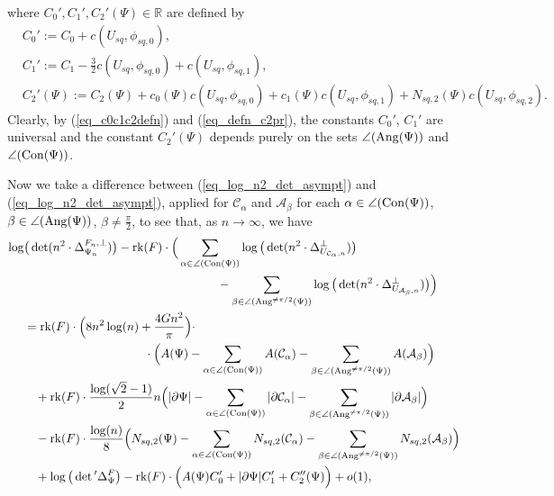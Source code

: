 \documentclass[12pt]{article}
\numberwithin{equation}{section}
\theoremstyle{theorem}
\theoremstyle{definition}
\theoremstyle{remark}
\newcommand{\real}{\mathbb{R}}
\newcommand{\laplcomp}{\Delta}
\newcommand{\rk}[1]{{\rm{rk}} ( #1 )}
\begin{document}
	where $C_0', C_1', C_2'(\Psi) \in \real$ are defined by
	\begin{equation}\label{eq_defn_c2pr}
	\begin{aligned}
		&
		C_0' := C_0 + c(U_{sq}, \phi_{sq, 0}),
		\\
		&
		C_1' := C_1 - \frac{3}{2} c(U_{sq}, \phi_{sq, 0}) +  c(U_{sq}, \phi_{sq, 1}),
		\\
		&
		C_2'(\Psi) := C_2(\Psi) + c_0(\Psi) c(U_{sq}, \phi_{sq, 0}) +  c_1(\Psi) c(U_{sq}, \phi_{sq, 1}) + N_{sq, 2}(\Psi) c(U_{sq}, \phi_{sq, 2}).
	\end{aligned}
	\end{equation}
	Clearly, by (\ref{eq_c0c1c2defn}) and (\ref{eq_defn_c2pr}), the constants $C_0'$, $C_1'$ are universal and the constant $C_2'(\Psi)$ depends purely on the sets $\angle({\rm{Ang}}(\Psi))$ and $\angle({\rm{Con}}(\Psi))$.
	\par 
	Now we take a difference between (\ref{eq_log_n2_det_asympt}) and (\ref{eq_log_n2_det_asympt}), applied for $\mathcal{C}_{\alpha}$ and $\mathcal{A}_{\beta}$ for each $\alpha \in \angle({\rm{Con}}(\Psi))$, $\beta \in \angle({\rm{Ang}}(\Psi))$, $\beta \neq \frac{\pi}{2}$, to see that, as $n \to \infty$, we have
	\begin{equation}\label{eq_log_n2_det_asympt2}
	\begin{aligned}
		\log & \big(\det(n^2 \cdot\laplcomp_{\Psi_n}^{F_n, \perp})\big)
		-
		\rk{F}
		\cdot
		\Big(
		\sum_{\alpha \in \angle({\rm{Con}}(\Psi))}
		\log \big(\det(n^2 \cdot  \laplcomp_{U_{\mathcal{C}_{\alpha}, n}}^{\perp})\big)
		\\
		&
		\qquad \qquad \qquad \qquad  \qquad \qquad \qquad \qquad 
		-
		\sum_{\beta \in \angle({\rm{Ang}}^{\neq \pi/2}(\Psi))}
		\log \big(\det(n^2 \cdot \laplcomp_{U_{\mathcal{A}_{\beta}, n}}^{\perp})\big)
		\Big)
		\\
		&
		=
		\rk{F}
		\cdot
		\Big( 8 n^2 \log(n) + \frac{4Gn^2}{\pi} \Big) \cdot 
		\\
		&
		\qquad \qquad \qquad \qquad \qquad 
		\cdot
		\Big( A(\Psi) -
			\sum_{\alpha \in \angle({\rm{Con}}(\Psi))}
			A(\mathcal{C}_{\alpha})
			-
			\sum_{\beta \in \angle({\rm{Ang}}^{\neq \pi/2}(\Psi))}
			A(\mathcal{A}_{\beta})
		\Big)
		\\
		&
		\phantom{= \,}
		+ 
		\rk{F}
		\cdot
		\frac{\log(\sqrt{2} - 1)}{2}
		n  
		\Big( | \partial \Psi | -
			\sum_{\alpha \in \angle({\rm{Con}}(\Psi))}
			|\partial  \mathcal{C}_{\alpha}|
			-
			\sum_{\beta \in \angle({\rm{Ang}}^{\neq \pi/2}(\Psi))}
			|\partial  \mathcal{A}_{\beta}|
		\Big)
		\\
		&
		\phantom{= \,}
		-
		\rk{F}
		\cdot
		\frac{\log(n)}{8} 
		\Big( N_{sq, 2}(\Psi) -
			\sum_{\alpha \in \angle({\rm{Con}}(\Psi))}
			N_{sq, 2}(\mathcal{C}_{\alpha})
			-
			\sum_{\beta \in \angle({\rm{Ang}}^{\neq \pi/2}(\Psi))}
			N_{sq, 2}(\mathcal{A}_{\beta})
		\Big)
		\\
		&
		\phantom{= \,}
		+ 
		\log \big( \det{}'\laplcomp_{\Psi}^{F} \big)
		-
		\rk{F}
		\cdot
		\Big(
		A(\Psi)C_0' 
		+
		|\partial \Psi| C_1' 
		+
		C_2''(\Psi)
		\Big)
		 + o(1),
	\end{aligned}
	\end{equation}
\end{document}
